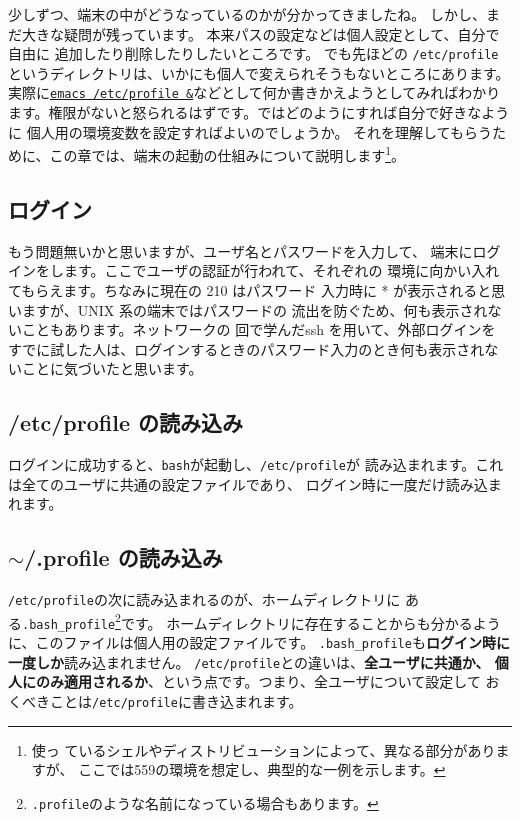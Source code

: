 \documentclass[a4j]{ltjreport}
\begin{document}
    少しずつ、端末の中がどうなっているのかが分かってきましたね。
    しかし、まだ大きな疑問が残っています。
    本来パスの設定などは個人設定として、自分で自由に
    追加したり削除したりしたいところです。
    でも先ほどの
    \verb+/etc/profile+　というディレクトリは、いかにも個人で変えられそうもないところにあります。
    実際に\underline{\texttt{emacs /etc/profile \&}}などとして何か書きかえようとしてみればわかり
    ます。権限がないと怒られるはずです。ではどのようにすれば自分で好きなように
    個人用の環境変数を設定すればよいのでしょうか。
    それを理解してもらうために、この章では、端末の起動の仕組みについて説明します\footnote{使っ
    ているシェルやディストリビューションによって、異なる部分がありますが、
    ここでは559の環境を想定し、典型的な一例を示します。}。

    \subsection{ログイン}
    もう問題無いかと思いますが、ユーザ名とパスワードを入力して、
    端末にログインをします。ここでユーザの認証が行われて、それぞれの
    環境に向かい入れてもらえます。ちなみに現在の 210 はパスワード
    入力時に * が表示されると思いますが、UNIX 系の端末ではパスワードの
    流出を防ぐため、何も表示されないこともあります。ネットワークの
    回で学んだssh を用いて、外部ログインを
    すでに試した人は、ログインするときのパスワード入力のとき何も表示されないことに気づいたと思います。

    \subsection{/etc/profile の読み込み}
    ログインに成功すると、\verb+bash+が起動し、\verb+/etc/profile+が
    読み込まれます。これは全てのユーザに共通の設定ファイルであり、
    ログイン時に一度だけ読み込まれます。

    \subsection{\texorpdfstring{$\sim$/.profile の読み込み}{~/.profile の読み込み}}
    \verb+/etc/profile+の次に読み込まれるのが、ホームディレクトリに
    ある\verb+.bash_profile+\footnote{\texttt{.profile}のような名前になっている場合もあります。}です。
    ホームディレクトリに存在することからも分かるように、このファイルは個人用の設定ファイルです。
    \verb+.bash_profile+も\textbf{ログイン時に一度しか}読み込まれません。
    \verb+/etc/profile+との違いは、\textbf{全ユーザに共通か、
    個人にのみ適用されるか}、という点です。つまり、全ユーザについて設定して
    おくべきことは\verb+/etc/profile+に書き込まれます。
\end{document}
